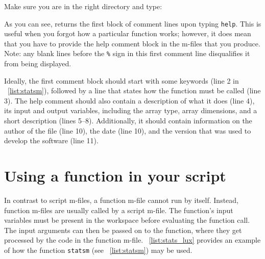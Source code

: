 \begin{action}
Make sure you are in the right directory and type:
\end{action}
As you can see, \MATLAB{} returns the first block of comment lines upon typing {\tt help}. This is useful when you forgot how a particular function works; however, it does mean that you have to provide the help comment block in the m-files that you produce. Note: any blank lines before the {\tt \%} sign in this first comment line disqualifies it from being displayed. 

Ideally, the first comment block should start with some keywords (line 2 in \lstlistingname{}~\ref{list:statsm}), followed by a line that states how the function must be called (line 3). The help comment should also contain a description of what it does (line 4), its input and output variables, including the array type, array dimensions, and a short description (lines 5--8). Additionally, it should contain information on the author of the file (line 10), the date (line 10), and the \MATLAB{} version that was used to develop the software (line 11).



\section{Using a function in your script}

In contrast to script m-files, a function m-file cannot run by itself. Instead, function m-files are usually called by a script m-file. The function's input variables must be present in the workspace before evaluating the function call. The input arguments can then be passed on to the function, where they get processed by the code in the function m-file. \lstlistingname~\ref{list:stats_lux} provides an example of how the function {\tt statsm} (see \lstlistingname~\ref{list:statsm}) may be used.





